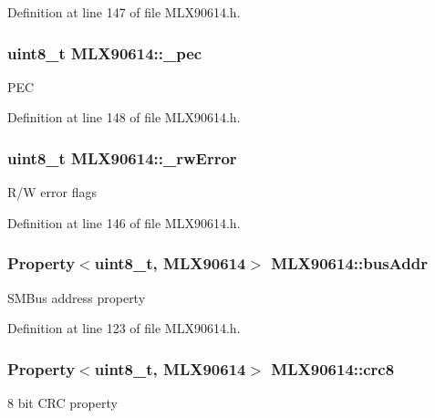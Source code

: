 Definition at line 147 of file M\-L\-X90614.\-h.

\hypertarget{class_m_l_x90614_a2526978eb988a8712baee6dca596be15}{
\subsubsection[{\-\_\-pec}]{\setlength{\rightskip}{0pt plus 5cm}uint8\-\_\-t M\-L\-X90614\-::\-\_\-pec\hspace{0.3cm}{\ttfamily [private]}}}\label{class_m_l_x90614_a2526978eb988a8712baee6dca596be15}
P\-E\-C 

Definition at line 148 of file M\-L\-X90614.\-h.

\hypertarget{class_m_l_x90614_a8c203cc9359c283d07682ba7dbcc5de3}{
\subsubsection[{\-\_\-rw\-Error}]{\setlength{\rightskip}{0pt plus 5cm}uint8\-\_\-t M\-L\-X90614\-::\-\_\-rw\-Error\hspace{0.3cm}{\ttfamily [private]}}}\label{class_m_l_x90614_a8c203cc9359c283d07682ba7dbcc5de3}
R/\-W error flags 

Definition at line 146 of file M\-L\-X90614.\-h.

\hypertarget{class_m_l_x90614_a66d99dc5778b514038c0fa5e25a722f1}{
\subsubsection[{bus\-Addr}]{\setlength{\rightskip}{0pt plus 5cm}Property$<$uint8\-\_\-t, {\bf M\-L\-X90614}$>$ M\-L\-X90614\-::bus\-Addr}}\label{class_m_l_x90614_a66d99dc5778b514038c0fa5e25a722f1}
S\-M\-Bus address property 

Definition at line 123 of file M\-L\-X90614.\-h.

\hypertarget{class_m_l_x90614_aa13abb960da5f7d8d0eb26df8632a679}{
\subsubsection[{crc8}]{\setlength{\rightskip}{0pt plus 5cm}Property$<$uint8\-\_\-t, {\bf M\-L\-X90614}$>$ M\-L\-X90614\-::crc8}}\label{class_m_l_x90614_aa13abb960da5f7d8d0eb26df8632a679}
8 bit C\-R\-C property 

